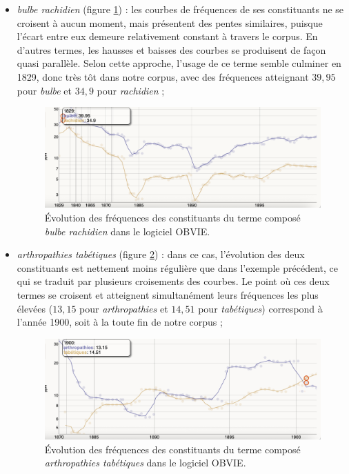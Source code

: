 \begin{itemize}
	\item \textit{bulbe rachidien} (figure \ref{fig:bulbe}) : les courbes de fréquences de ses constituants ne se croisent à aucun moment, mais présentent des pentes similaires, puisque l'écart entre eux demeure relativement constant à travers le corpus. En d'autres termes, les hausses et baisses des courbes se produisent de façon quasi parallèle. Selon cette approche, l'usage de ce terme semble culminer en 1829, donc très tôt dans notre corpus, avec des fréquences atteignant $39,95$ pour \textit{bulbe} et $34,9$ pour \textit{rachidien} ;
	
	\begin{figure}[h]
		\centering
		\includegraphics[width=1\textwidth]{img/bulbe.png}
		\caption{Évolution des fréquences des constituants du terme composé \textit{bulbe rachidien} dans le logiciel \textsc{OBVIE}.
		}
		\label{fig:bulbe}
	\end{figure}
	
	
	\item \textit{arthropathies tabétiques} (figure \ref{fig:arthropathies}) : dans ce cas, l'évolution des deux constituants est nettement moins régulière que dans l'exemple précédent, ce qui se traduit par plusieurs croisements des courbes. Le point où ces deux termes se croisent et atteignent simultanément leurs fréquences les plus élevées ($13,15$ pour \textit{arthropathies} et $14,51$ pour \textit{tabétiques}) correspond à l'année 1900, soit à la toute fin de notre corpus ;
	
	\begin{figure}[h]
		\centering
		\includegraphics[width=1\textwidth]{img/arthropathies.png}
		\caption{Évolution des fréquences des constituants du terme composé \textit{arthropathies tabétiques} dans le logiciel \textsc{OBVIE}.
		}
		\label{fig:arthropathies}
	\end{figure}
	

\end{itemize}
